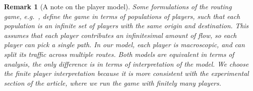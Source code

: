 \documentclass{sig-alternate-ipsn13}
\newtheorem{remark}{Remark}
\begin{document}
\begin{remark}[A note on the player model] Some formulations of the routing game, e.g.~\cite{sandholm2001potential,krichene2015learning}, define the game in terms of \emph{populations} of players, such that each population is an infinite set of players with the same origin and destination. This assumes that each player contributes an infinitesimal amount of flow, so each player can pick a single path. In our model, each player is macroscopic, and can split its traffic across multiple routes. Both models are equivalent in terms of analysis, the only difference is in terms of interpretation of the model. We choose the finite player interpretation because it is more consistent with the experimental section of the article, where we run the game with finitely many players.
\end{remark}
\end{document}
